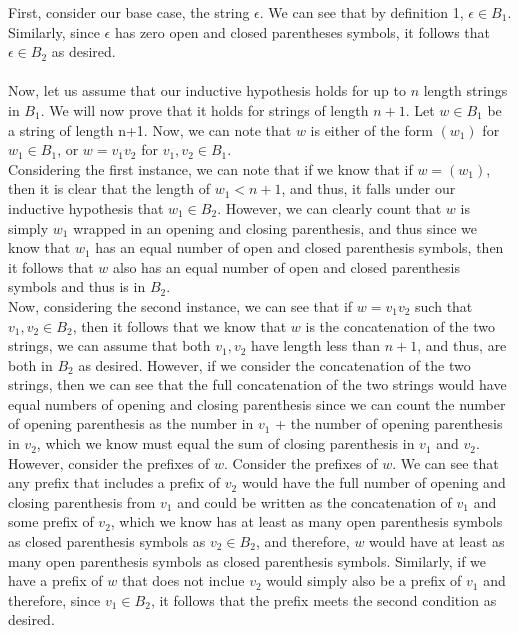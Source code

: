 \documentclass[11pt]{article}
\begin{document}
\begin{enumerate}
	 First, consider our base case, the string $\epsilon$. We can see that by definition 1, $\epsilon \in B_1$. Similarly, since $\epsilon$ has zero open and closed parentheses symbols, it follows that $\epsilon \in B_2$ as desired.\\\\
	 Now, let us assume that our inductive hypothesis holds for up to $n$ length strings in $B_1$. We will now prove that it holds for strings of length $n+1$. Let $w \in B_1$ be a string of length n+1. Now, we can note that $w$ is either of the form $(w_1)$ for $w_1 \in B_1$, or $w = v_1v_2$ for $v_1, v_2 \in B_1$.\\
	 Considering the first instance, we can note that if we know that if $w = (w_1)$, then it is clear that the length of $w_1 < n + 1$, and thus, it falls under our inductive hypothesis that $w_1 \in B_2$. However, we can clearly count that $w$ is simply $w_1$ wrapped in an opening and closing parenthesis, and thus since we know that $w_1$ has an equal number of open and closed parenthesis symbols, then it follows that $w$ also has an equal number of open and closed parenthesis symbols and thus is in $B_2$.\\
	 Now, considering the second instance, we can see that if $w = v_1v_2$ such that $v_1,v_2 \in B_2$, then it follows that we know that $w$ is the concatenation of the two strings, we can assume that both $v_1, v_2$ have length less than $n+1$, and thus, are both in $B_2$ as desired. However, if we consider the concatenation of the two strings, 
	 then we can see that the full concatenation of the two strings would have equal numbers of opening and closing parenthesis since we can count the number of opening parenthesis as the number in $v_1$  + the number of opening parenthesis in $v_2$, which we know must equal the sum of closing parenthesis in $v_1$ and $v_2$. However, consider the prefixes of $w$.
	 Consider the prefixes of $w$. We can see that any prefix that includes a prefix of $v_2$ would have the full number of opening and closing parenthesis from $v_1$ and could be written as the concatenation of $v_1$ and some prefix of $v_2$, which we know has at least as many open parenthesis symbols as closed parenthesis symbols as $v_2 \in B_2$, and therefore, $w$ would have at least as many
	 open parenthesis symbols as closed parenthesis symbols. Similarly, if we have a prefix of $w$ that does not inclue $v_2$ would simply also be a prefix of $v_1$ and therefore, since $v_1 \in B_2$, it follows that the prefix meets the second condition as desired.\\\\

\end{enumerate}
\end{document}
